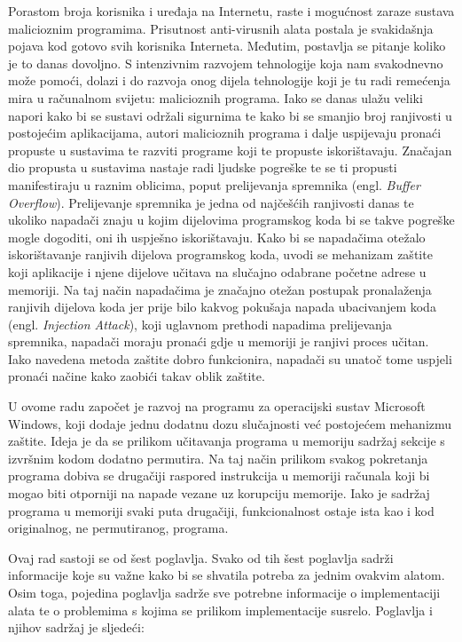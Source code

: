 \documentclass[times, utf8, diplomski, numeric]{fer}
\begin{document}
Porastom broja korisnika i uređaja na Internetu, raste i
mogućnost zaraze sustava malicioznim programima. Prisutnost
anti-virusnih alata postala je svakidašnja pojava kod gotovo svih
korisnika Interneta. Međutim, postavlja se pitanje koliko je to
danas dovoljno. S intenzivnim razvojem tehnologije koja nam
svakodnevno može pomoći, dolazi i do razvoja onog dijela
tehnologije koji je tu radi remećenja mira u računalnom svijetu:
malicioznih programa. Iako se danas ulažu veliki napori kako bi se
sustavi održali sigurnima te kako bi se smanjio broj ranjivosti u
postojećim aplikacijama, autori malicioznih programa i dalje
uspijevaju pronaći propuste u sustavima te razviti programe koji
te propuste iskorištavaju. Značajan dio propusta u sustavima
nastaje radi ljudske pogreške te se ti propusti manifestiraju u
raznim oblicima, poput prelijevanja spremnika (engl. \emph{Buffer
Overflow}). Prelijevanje spremnika je jedna od najčešćih ranjivosti danas te
ukoliko napadači znaju u kojim dijelovima programskog koda bi se
takve pogreške mogle dogoditi, oni ih uspješno iskorištavaju.
Kako bi se napadačima otežalo iskorištavanje ranjivih dijelova
programskog koda, uvodi se mehanizam zaštite koji aplikacije i
njene dijelove učitava na slučajno odabrane početne adrese u
memoriji. Na taj način napadačima je značajno otežan postupak
pronalaženja ranjivih dijelova koda jer prije bilo kakvog
pokušaja napada ubacivanjem koda (engl. \emph{Injection Attack}),
koji uglavnom prethodi napadima prelijevanja spremnika, napadači
moraju pronaći gdje u memoriji je ranjivi proces učitan. Iako
navedena metoda zaštite dobro funkcionira, napadači su unatoč
tome uspjeli pronaći načine kako zaobići takav oblik zaštite.

U ovome radu započet je razvoj na programu za operacijski sustav
Microsoft Windows, koji dodaje jednu dodatnu dozu slučajnosti već
postojećem mehanizmu zaštite. Ideja je da se prilikom učitavanja
programa u memoriju sadržaj sekcije s izvršnim kodom dodatno
permutira. Na taj način prilikom svakog pokretanja programa
dobiva se drugačiji raspored instrukcija u memoriji računala koji
bi mogao biti otporniji na napade vezane uz korupciju memorije.
Iako je sadržaj programa u memoriji svaki puta drugačiji,
funkcionalnost ostaje ista kao i kod originalnog, ne
permutiranog, programa.

Ovaj rad sastoji se od šest poglavlja. Svako od tih šest
poglavlja sadrži informacije koje su važne kako bi se shvatila
potreba za jednim ovakvim alatom. Osim toga, pojedina poglavlja
sadrže sve potrebne informacije o implementaciji alata te o
problemima s kojima se prilikom implementacije susrelo.
Poglavlja i njihov sadržaj je sljedeći:
\end{document}
